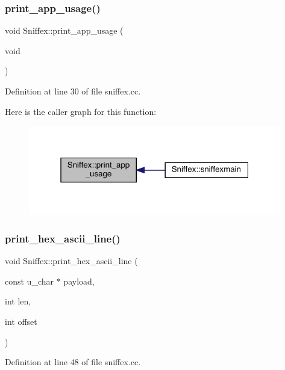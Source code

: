 \subsubsection{\texorpdfstring{print\+\_\+app\+\_\+usage()}{print\_app\_usage()}}
{\footnotesize\ttfamily void Sniffex\+::print\+\_\+app\+\_\+usage (\begin{DoxyParamCaption}\item[{void}]{ }\end{DoxyParamCaption})}



Definition at line 30 of file sniffex.\+cc.

Here is the caller graph for this function\+:\nopagebreak
\begin{figure}[H]
\begin{center}
\leavevmode
\includegraphics[width=313pt]{class_sniffex_aea81794fe2ac6e2b857eef01c3b109e5_icgraph}
\end{center}
\end{figure}
\mbox{\label{class_sniffex_aec1e34cb4b2ff906304f957c205707ea}} 
\subsubsection{\texorpdfstring{print\+\_\+hex\+\_\+ascii\+\_\+line()}{print\_hex\_ascii\_line()}}
{\footnotesize\ttfamily void Sniffex\+::print\+\_\+hex\+\_\+ascii\+\_\+line (\begin{DoxyParamCaption}\item[{const u\+\_\+char $\ast$}]{payload,  }\item[{int}]{len,  }\item[{int}]{offset }\end{DoxyParamCaption})}



Definition at line 48 of file sniffex.\+cc.

